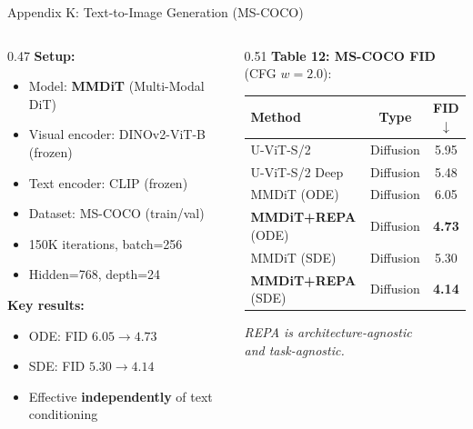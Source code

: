 \documentclass[aspectratio=169, 10pt]{beamer}
\begin{document}
\begin{frame}{Appendix K: Text-to-Image Generation (MS-COCO)}
\small
\begin{columns}[T]
\begin{column}{0.47\textwidth}
\textbf{Setup:}
\begin{itemize}\setlength{\itemsep}{2pt}
  \item Model: \textbf{MMDiT} (Multi-Modal DiT)
  \item Visual encoder: DINOv2-ViT-B (frozen)
  \item Text encoder: CLIP (frozen)
  \item Dataset: MS-COCO (train/val)
  \item 150K iterations, batch=256
  \item Hidden=768, depth=24
\end{itemize}

\vspace{0.5em}
\textbf{Key results:}
\begin{itemize}\setlength{\itemsep}{2pt}
  \item ODE: FID $6.05 \to \mathbf{4.73}$
  \item SDE: FID $5.30 \to \mathbf{4.14}$
  \item Effective \textbf{independently} of text conditioning
\end{itemize}
\end{column}
\begin{column}{0.51\textwidth}
\textbf{Table 12: MS-COCO FID} (CFG $w{=}2.0$):

\vspace{0.3em}
\begin{tabular}{lcc}
\toprule
\textbf{Method} & \textbf{Type} & \textbf{FID$\downarrow$} \\
\midrule
U-ViT-S/2       & Diffusion & 5.95 \\
U-ViT-S/2 Deep  & Diffusion & 5.48 \\
\midrule
MMDiT (ODE)     & Diffusion & 6.05 \\
\textbf{MMDiT+REPA} (ODE) & Diffusion & \textbf{4.73} \\
MMDiT (SDE)     & Diffusion & 5.30 \\
\textbf{MMDiT+REPA} (SDE) & Diffusion & \textbf{4.14} \\
\bottomrule
\end{tabular}

\vspace{0.5em}
\textit{REPA is architecture-agnostic \\
and task-agnostic.}
\end{column}
\end{columns}
\end{frame}
\end{document}
